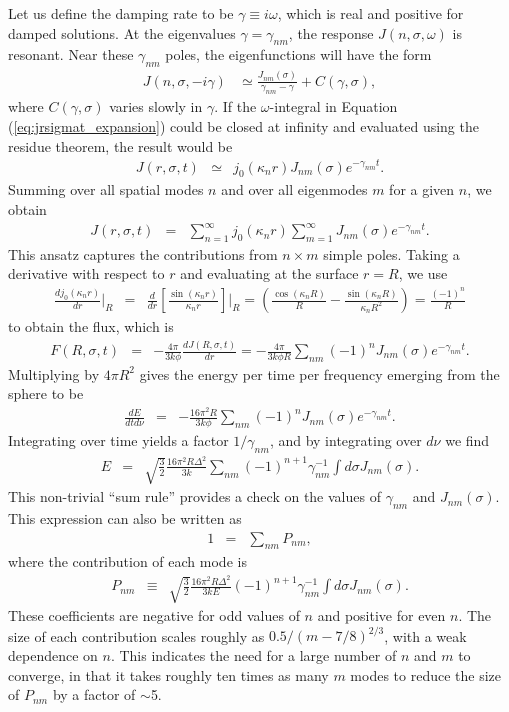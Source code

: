 \documentclass[linenumbers]{aastex63}
\newcommand{\be}{\begin{eqnarray}}
\newcommand{\ee}{\end{eqnarray}}
\begin{document}
Let us define the damping rate to be $\gamma \equiv i\omega$, which is real and positive for damped solutions. At the eigenvalues $\gamma=\gamma_{nm}$, the response $J(n, \sigma, \omega)$ is resonant. Near these $\gamma_{nm}$ poles, the eigenfunctions will have the form 
\be \label{eq:jnsigmaomega_approx}
J(n,\sigma,-i\gamma) & \simeq \frac{ J_{nm}(\sigma) }{\gamma_{nm} - \gamma} + C(\gamma, \sigma),
\ee
where $C(\gamma, \sigma)$ varies slowly in $\gamma$. If the $\omega$-integral in Equation (\ref{eq:jrsigmat_expansion}) could be closed at infinity and evaluated using the residue theorem, the result would be
\be
J(r,\sigma,t) & \simeq & j_0(\kappa_n r) J_{nm}(\sigma) e^{-\gamma_{nm}t}.
\ee
Summing over all spatial modes $n$ and over all eigenmodes $m$ for a given $n$, we obtain
\be \label{eq:Jrsigmat}
J(r,\sigma,t) & = & \sum_{n=1}^\infty j_0(\kappa_n r)  \sum_{m=1}^{\infty} J_{nm}(\sigma) e^{-\gamma_{nm}t}.
\ee
This ansatz captures the contributions from $n \times m$ simple poles. Taking a derivative with respect to $r$ and evaluating at the surface $r=R$, we use
\be
\frac{dj_0(\kappa_n r)}{dr} \bigg\rvert_R & =& \frac{d}{dr} \left[ \frac{\sin(\kappa_n r)}{\kappa_n r} \right]\bigg\rvert_R
=  \left( \frac{\cos(\kappa_n R)}{R} - \frac{\sin(\kappa_n R)}{\kappa_n R^2} \right)  =  \frac{(-1)^n}{R}
\ee
to obtain the flux, which is
\be
F(R,\sigma,t) & =& - \frac{4\pi}{3k\phi} \frac{dJ(R,\sigma,t)}{dr} 
= - \frac{4\pi}{3k\phi R}  \sum_{nm} (-1)^n J_{nm}(\sigma) e^{-\gamma_{nm}t}.
\ee
Multiplying by $4\pi R^2$ gives the energy per time per frequency emerging from the sphere to be
\be
\frac{dE}{dtd\nu} & = & - \frac{16\pi^2 R}{3k\phi}  \sum_{nm} (-1)^n J_{nm}(\sigma) e^{-\gamma_{nm}t}.
\label{eq:dEdtdnu}
\ee
Integrating over time yields a factor $1/\gamma_{nm}$, and by integrating over $d\nu$ we find
\be \label{eq:sum_rule}
E & = &  \sqrt{ \frac{3}{2} } \frac{16\pi^2R\Delta^2}{3k} \sum_{nm} (-1)^{n+1} \gamma_{nm}^{-1} \int d\sigma J_{nm}(\sigma).
\ee
This non-trivial ``sum rule'' provides a check on the values of $\gamma_{nm}$ and $J_{nm}(\sigma)$. This expression can also be written as
\be
1 & =& \sum_{nm} P_{nm},
\label{eq:sumrule}
\ee
where the contribution of each mode is
\be \label{eq:pnmsoln}
P_{nm} & \equiv & \sqrt{ \frac{3}{2} } \frac{16\pi^2R\Delta^2}{3kE}  (-1)^{n+1} \gamma_{nm}^{-1} \int d\sigma J_{nm}(\sigma).
\ee
These coefficients are negative for odd values of $n$ and positive for even $n$. The size of each contribution scales roughly as $0.5/(m-7/8)^{2/3}$, with a weak dependence on $n$. This indicates the need for a large number of $n$ and $m$ to converge, in that it takes roughly ten times as many $m$ modes to reduce the size of $P_{nm}$ by a factor of ${\sim}$5. 
\end{document}
